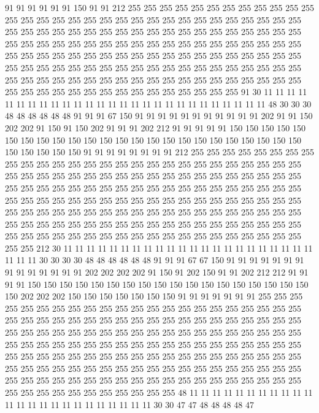 91 91 91 91 91 91 150 91 91 212 255 255 255 255 255 255 255 255 255 255
255 255 255 255 255 255 255 255 255 255 255 255 255 255 255 255 255 255 255 255
255 255 255 255 255 255 255 255 255 255 255 255 255 255 255 255 255 255 255 255
255 255 255 255 255 255 255 255 255 255 255 255 255 255 255 255 255 255 255 255
255 255 255 255 255 255 255 255 255 255 255 255 255 255 255 255 255 255 255 255
255 255 255 255 255 255 255 255 255 255 255 255 255 255 255 255 255 255 255 255
255 255 255 255 255 255 255 255 255 255 255 255 255 255 255 255 255 255 255 255
255 255 255 255 255 255 255 255 255 255 255 91 30 11 11 11 11 11 11 11
11 11 11 11 11 11 11 11 11 11 11 11 11 11 11 11 11 11 11 11
48 30 30 30 48 48 48 48 48 48 91 91 91 67 150 91 91 91 91 91
91 91 91 91 91 91 202 91 91 150 202 202 91 150 91 150 202 91 91 91
202 212 91 91 91 91 91 150 150 150 150 150 150 150 150 150 150 150 150 150
150 150 150 150 150 150 150 150 150 150 150 150 150 150 150 150 91 91 91 91
91 91 91 91 212 255 255 255 255 255 255 255 255 255 255 255 255 255 255 255
255 255 255 255 255 255 255 255 255 255 255 255 255 255 255 255 255 255 255 255
255 255 255 255 255 255 255 255 255 255 255 255 255 255 255 255 255 255 255 255
255 255 255 255 255 255 255 255 255 255 255 255 255 255 255 255 255 255 255 255
255 255 255 255 255 255 255 255 255 255 255 255 255 255 255 255 255 255 255 255
255 255 255 255 255 255 255 255 255 255 255 255 255 255 255 255 255 255 255 255
255 255 255 255 255 255 255 255 255 255 255 255 255 255 255 255 255 255 255 255
255 255 255 255 255 255 255 255 212 30 11 11 11 11 11 11 11 11 11 11
11 11 11 11 11 11 11 11 11 11 11 11 11 11 11 30 30 30 30 48
48 48 48 48 48 91 91 91 67 67 150 91 91 91 91 91 91 91 91 91
91 91 91 91 91 202 202 202 202 91 150 91 202 150 91 91 202 212 212 91
91 91 91 150 150 150 150 150 150 150 150 150 150 150 150 150 150 150 150 150
150 150 202 202 202 150 150 150 150 150 150 150 91 91 91 91 91 91 91 255
255 255 255 255 255 255 255 255 255 255 255 255 255 255 255 255 255 255 255 255
255 255 255 255 255 255 255 255 255 255 255 255 255 255 255 255 255 255 255 255
255 255 255 255 255 255 255 255 255 255 255 255 255 255 255 255 255 255 255 255
255 255 255 255 255 255 255 255 255 255 255 255 255 255 255 255 255 255 255 255
255 255 255 255 255 255 255 255 255 255 255 255 255 255 255 255 255 255 255 255
255 255 255 255 255 255 255 255 255 255 255 255 255 255 255 255 255 255 255 255
255 255 255 255 255 255 255 255 255 255 255 255 255 255 255 255 255 255 255 255
255 255 255 255 255 255 48 11 11 11 11 11 11 11 11 11 11 11 11 11
11 11 11 11 11 11 11 11 11 11 11 30 30 47 47 48 48 48 48 47
